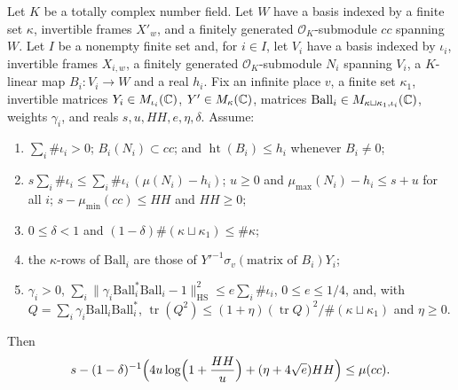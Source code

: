 \begin{theorem}\label{geoa:theoremF-sharp}
Let $K$ be a totally complex number field. Let $W$ have a basis indexed by a finite set
$\kappa$, invertible frames $X'_w$, and a finitely generated $\mathcal O_K$-submodule
$cc$ spanning $W$. Let $I$ be a nonempty finite set and, for $i\in I$, let $V_i$ have a
basis indexed by $\iota_i$, invertible frames $X_{i,w}$, a finitely generated
$\mathcal O_K$-submodule $N_i$ spanning $V_i$, a $K$-linear map $B_i\colon V_i\to W$ and
a real $h_i$. Fix an infinite place $v$, a finite set $\kappa_1$, invertible matrices
$Y_i\in M_{\iota_i}(\mathbb{C})$, $Y'\in M_{\kappa}(\mathbb{C})$, matrices
$\mathrm{Ball}_i\in M_{\kappa\sqcup\kappa_1,\iota_i}(\mathbb{C})$, weights $\gamma_i$, and reals
$s,u,HH,e,\eta,\delta$. Assume:
\begin{enumerate}
\item $\sum_i\#\iota_i>0$; $B_i(N_i)\subset cc$; and $\operatorname{ht}(B_i)\le h_i$
whenever $B_i\ne0$;
\item $s\sum_i\#\iota_i\le\sum_i\#\iota_i\,(\mu(N_i)-h_i)$; $u\ge0$ and
$\mu_{\max}(N_i)-h_i\le s+u$ for all $i$; $s-\mu_{\min}(cc)\le HH$ and $HH\ge0$;
\item $0\le\delta<1$ and $(1-\delta)\#(\kappa\sqcup\kappa_1)\le\#\kappa$;
\item the $\kappa$-rows of $\mathrm{Ball}_i$ are those of
$Y'^{-1}\sigma_v(\text{matrix of }B_i)Y_i$;
\item $\gamma_i>0$, $\sum_i\|\gamma_i\mathrm{Ball}_i^*\mathrm{Ball}_i-1\|_{\mathrm{HS}}^2\le
e\sum_i\#\iota_i$, $0\le e\le1/4$, and, with
$Q=\sum_i\gamma_i\mathrm{Ball}_i\mathrm{Ball}_i^*$,
$\operatorname{tr}(Q^2)\le(1+\eta)(\operatorname{tr}Q)^2/\#(\kappa\sqcup\kappa_1)$ and
$\eta\ge0$.
\end{enumerate}
Then
\[
s-(1-\delta)^{-1}\Bigl(4u\log\Bigl(1+\frac{HH}u\Bigr)+(\eta+4\sqrt e)HH\Bigr)\le\mu(cc).
\]
\end{theorem}
